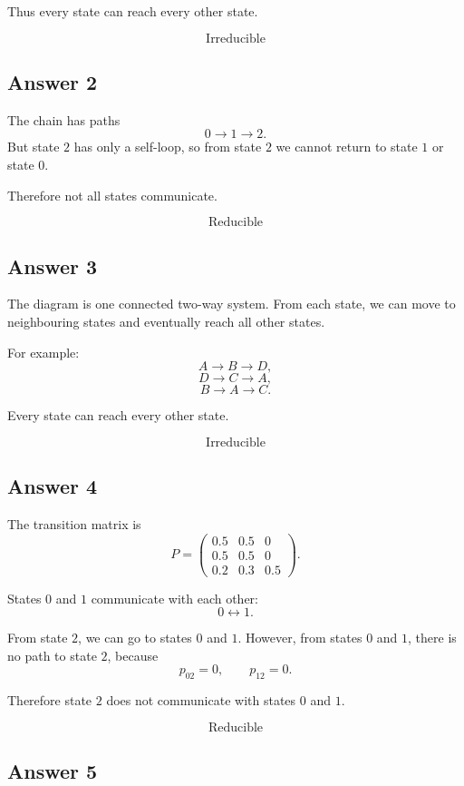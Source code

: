 \documentclass[12pt,a4paper]{article}
\theoremstyle{notestyle}
\begin{document}
Thus every state can reach every other state.

\[
\boxed{\text{Irreducible}}
\]

\subsection*{Answer 2}

The chain has paths
\[
0\to 1\to 2.
\]
But state $2$ has only a self-loop, so from state $2$ we cannot return to state $1$ or state $0$.

Therefore not all states communicate.

\[
\boxed{\text{Reducible}}
\]

\subsection*{Answer 3}

The diagram is one connected two-way system. From each state, we can move to neighbouring states and eventually reach all other states.

For example:
\[
A\to B\to D,
\]
\[
D\to C\to A,
\]
\[
B\to A\to C.
\]

Every state can reach every other state.

\[
\boxed{\text{Irreducible}}
\]

\subsection*{Answer 4}

The transition matrix is
\[
P=
\begin{pmatrix}
0.5 & 0.5 & 0\\
0.5 & 0.5 & 0\\
0.2 & 0.3 & 0.5
\end{pmatrix}.
\]

States $0$ and $1$ communicate with each other:
\[
0\leftrightarrow 1.
\]

From state $2$, we can go to states $0$ and $1$. However, from states $0$ and $1$, there is no path to state $2$, because
\[
p_{02}=0,\qquad p_{12}=0.
\]

Therefore state $2$ does not communicate with states $0$ and $1$.

\[
\boxed{\text{Reducible}}
\]

\subsection*{Answer 5}
\end{document}
